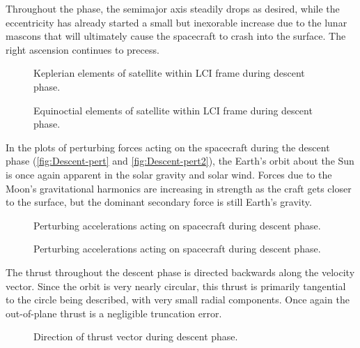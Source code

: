 Throughout the phase, the semimajor axis steadily drops as desired, while the eccentricity has already started a small but inexorable increase due to the lunar mascons that will ultimately cause the spacecraft to crash into the surface. The right ascension continues to precess.

\begin{figure}
\centering
\def\svgwidth{\figurewidth}

\caption{Keplerian elements of satellite within LCI frame during descent phase.} \label{fig:Descent-kep-lci}
\end{figure}

\begin{figure}
\centering
\def\svgwidth{\figurewidth}

\caption{Equinoctial elements of satellite within LCI frame during descent phase.} \label{fig:Descent-mee}
\end{figure}

In the plots of perturbing forces acting on the spacecraft during the descent phase (\autoref{fig:Descent-pert} and \autoref{fig:Descent-pert2}), the Earth's orbit about the Sun is once again apparent in the solar gravity and solar wind. Forces due to the Moon's gravitational harmonics are increasing in strength as the craft gets closer to the surface, but the dominant secondary force is still Earth's gravity.

\begin{figure}
\centering
\def\svgwidth{\figurewidth}

\caption{Perturbing accelerations acting on spacecraft during descent phase.} \label{fig:Descent-pert}
\end{figure}

\begin{figure}
\centering
\def\svgwidth{\figurewidth}

\caption{Perturbing accelerations acting on spacecraft during descent phase.} \label{fig:Descent-pert2}
\end{figure}

The thrust throughout the descent phase is directed backwards along the velocity vector. Since the orbit is very nearly circular, this thrust is primarily tangential to the circle being described, with very small radial components. Once again the out-of-plane thrust is a negligible truncation error.

\begin{figure}
\centering
\def\svgwidth{\figurewidth}

\caption{Direction of thrust vector during descent phase.} \label{fig:Descent-thrust}
\end{figure}

